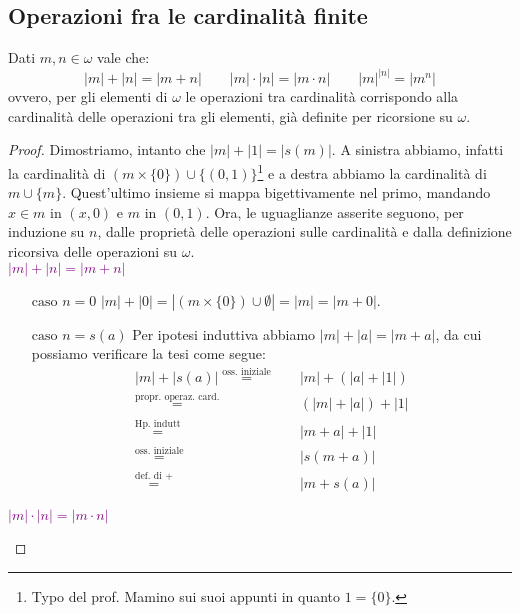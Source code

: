 \documentclass[11pt]{scrartcl}
\begin{document}
\subsection{Operazioni fra le cardinalità finite}

\begin{proposition}
	\label{op_card_fin}
	Dati $m,n \in \omega$ vale che:
	\[ |m| + |n| = |m+n| \qquad |m|\cdot|n| = |m \cdot n| \qquad |m|^{|n|} = |m^n|
		\]
	ovvero, per gli elementi di $\omega$ le operazioni tra cardinalità corrispondo alla cardinalità delle operazioni tra gli elementi, già definite per ricorsione su $\omega$.
\end{proposition}

\begin{proof}
	Dimostriamo, intanto che $|m| + |1| = |s(m)|$. A sinistra abbiamo, infatti la cardinalità di $(m \times \{0\}) \cup \{(0,1)\}$\footnote{Typo del prof. Mamino sui suoi appunti in quanto $1 = \{0\}$.} e a destra abbiamo la cardinalità di $m \cup \{m\}$.
	Quest'ultimo insieme si mappa bigettivamente nel primo, mandando $x \in m$ in $(x,0)$ e $m$ in $(0,1)$. 
	Ora, le uguaglianze asserite seguono, per induzione su $n$, dalle proprietà delle operazioni sulle cardinalità e dalla definizione ricorsiva delle operazioni su $\omega$.\\
	\textcolor{purple}{$|m|+|n| = |m+n|$}
	\begin{itemize}
		\item[$\boxed{\text{caso $n = 0$}}$] $|m| + |0| =  |(m \times \{0\}) \cup \emptyset| = |m| = |m + 0|$.
		\item[$\boxed{\text{caso $n = s(a)$}}$] Per ipotesi induttiva abbiamo $|m| + |a| = |m + a|$, da cui possiamo verificare la tesi come segue:
		\[ \begin{split}
			|m| + |s(a)| \overset{\text{oss. iniziale}}{=}\quad& |m| + (|a| + |1|) \\
						 \overset{\text{propr. operaz. card.}}{=}& (|m| + |a|) + |1| \\
						 \overset{\text{Hp. indutt}}{=}\quad& |m+a| + |1| \\
						 \overset{\text{oss. iniziale}}{=}\quad& |s(m+a)| \\
						 \overset{\text{def. di $+$}}{=}\quad\;& |m + s(a)|
 		\end{split} 
			\]
	\end{itemize}
	\textcolor{purple}{$|m|\cdot|n| = |m \cdot n|$}
	\begin{itemize}

\end{itemize}
\end{proof}
\end{document}
